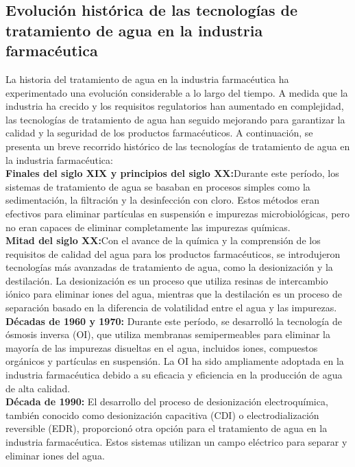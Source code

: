 \subsection{Evolución histórica de las tecnologías de tratamiento de agua en la industria farmacéutica}

La historia del tratamiento de agua en la industria farmacéutica ha experimentado una evolución considerable a lo largo del tiempo. A medida que la industria ha crecido y los requisitos regulatorios han aumentado en complejidad, las tecnologías de tratamiento de agua han seguido mejorando para garantizar la calidad y la seguridad de los productos farmacéuticos. A continuación, se presenta un breve recorrido histórico de las tecnologías de tratamiento de agua en la industria farmacéutica:\\

\textbf{Finales del siglo XIX y principios del siglo XX:}Durante este período, los sistemas de tratamiento de agua se basaban en procesos simples como la sedimentación, la filtración y la desinfección con cloro. Estos métodos eran efectivos para eliminar partículas en suspensión e impurezas microbiológicas, pero no eran capaces de eliminar completamente las impurezas químicas.\\

\textbf{Mitad del siglo XX:}Con el avance de la química y la comprensión de los requisitos de calidad del agua para los productos farmacéuticos, se introdujeron tecnologías más avanzadas de tratamiento de agua, como la desionización y la destilación. La desionización es un proceso que utiliza resinas de intercambio iónico para eliminar iones del agua, mientras que la destilación es un proceso de separación basado en la diferencia de volatilidad entre el agua y las impurezas.\\

\textbf{Décadas de 1960 y 1970:} Durante este período, se desarrolló la tecnología de ósmosis inversa (OI), que utiliza membranas semipermeables para eliminar la mayoría de las impurezas disueltas en el agua, incluidos iones, compuestos orgánicos y partículas en suspensión. La OI ha sido ampliamente adoptada en la industria farmacéutica debido a su eficacia y eficiencia en la producción de agua de alta calidad.\\

\textbf{Década de 1990:} El desarrollo del proceso de desionización electroquímica, también conocido como desionización capacitiva (CDI) o electrodialización reversible (EDR), proporcionó otra opción para el tratamiento de agua en la industria farmacéutica. Estos sistemas utilizan un campo eléctrico para separar y eliminar iones del agua.\\

